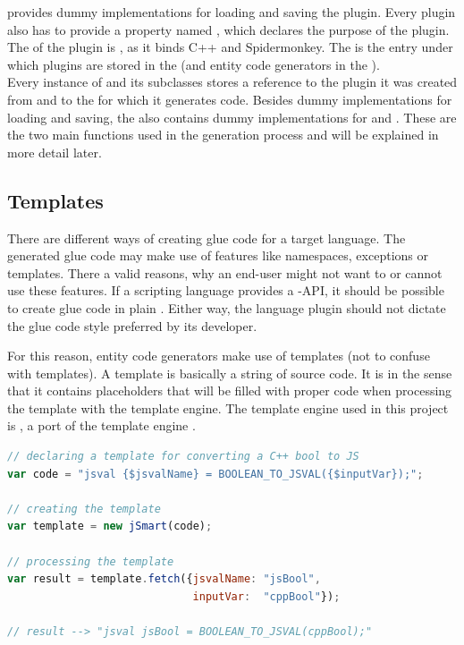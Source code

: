 provides dummy implementations for loading and saving the plugin. Every plugin also has to provide a property named , which declares the purpose of the plugin. The  of the  plugin is , as it binds C++ and Spidermonkey. The  is the entry under which plugins are stored in the  (and entity code generators in the ).
\\Every instance of  and its subclasses stores a reference to the plugin it was created from and to the  for which it generates code. Besides dummy implementations for loading and saving, the  also contains dummy implementations for  and . These are the two main functions used in the generation process and will be explained in more detail later.

\subsection{Templates}

There are different ways of creating glue code for a target language. The generated glue code may make use of  features like namespaces, exceptions or templates. There a valid reasons, why an end-user might not want to or cannot use these features. If a scripting language provides a -API, it should be possible to create glue code in plain . Either way, the language plugin should not dictate the glue code style preferred by its developer.

For this reason, entity code generators make use of templates (not to confuse with  templates). A template is basically a string of  source code. It is  in the sense that it contains placeholders that will be filled with proper code when processing the template with the template engine. The template engine used in this project is , a  port of the  template engine .

\newpage
\SingleSpacing
\begin{lstlisting}[language=JavaScript, caption=Template for converting a \mySCName{bool} to \myProperName{JavaScript} in \myProperName{Spidermonkey}, label=lst:TemplateBool]
// declaring a template for converting a C++ bool to JS
var code = "jsval {$jsvalName} = BOOLEAN_TO_JSVAL({$inputVar});";

// creating the template
var template = new jSmart(code);

// processing the template
var result = template.fetch({jsvalName: "jsBool", 
                             inputVar:  "cppBool"});
                             
// result --> "jsval jsBool = BOOLEAN_TO_JSVAL(cppBool);"
\end{lstlisting}
\OnehalfSpacing

